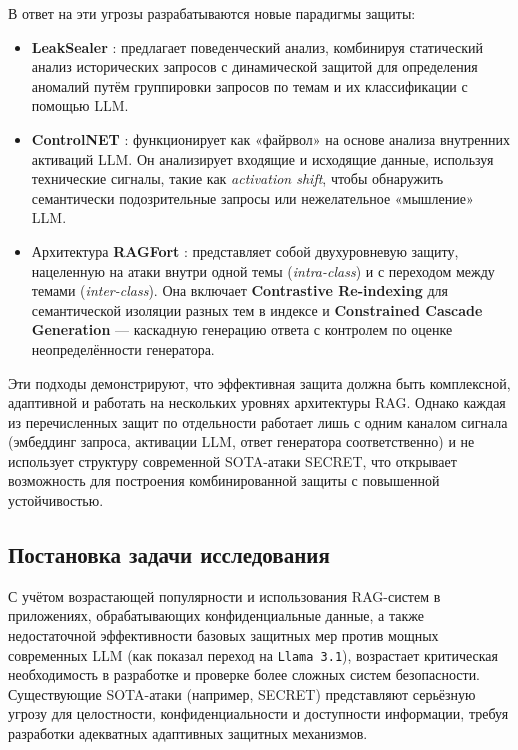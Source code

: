 \documentclass[12pt, a4paper]{article}
\theoremstyle{definition}
\theoremstyle{remark}
\begin{document}
В ответ на эти угрозы разрабатываются новые парадигмы защиты:
\begin{itemize}[label=$\bullet$]
    \item \textbf{LeakSealer} \cite{LeakSealer2025}: предлагает поведенческий анализ, комбинируя статический анализ исторических запросов с динамической защитой для определения аномалий путём группировки запросов по темам и их классификации с помощью LLM.
    \item \textbf{ControlNET} \cite{ControlNET2025}: функционирует как «файрвол» на основе анализа внутренних активаций LLM. Он анализирует входящие и исходящие данные, используя технические сигналы, такие как \textit{activation shift}, чтобы обнаружить семантически подозрительные запросы или нежелательное «мышление» LLM.
    \item Архитектура \textbf{RAGFort} \cite{RAGFort2025}: представляет собой двухуровневую защиту, нацеленную на атаки внутри одной темы (\textit{intra-class}) и с переходом между темами (\textit{inter-class}). Она включает \textbf{Contrastive Re-indexing} для семантической изоляции разных тем в индексе и \textbf{Constrained Cascade Generation} — каскадную генерацию ответа с контролем по оценке неопределённости генератора.
\end{itemize}
Эти подходы демонстрируют, что эффективная защита должна быть комплексной, адаптивной и работать на нескольких уровнях архитектуры RAG. Однако каждая из перечисленных защит по отдельности работает лишь с одним каналом сигнала (эмбеддинг запроса, активации LLM, ответ генератора соответственно) и не использует структуру современной SOTA-атаки SECRET, что открывает возможность для построения комбинированной защиты с повышенной устойчивостью.

\subsection{Постановка задачи исследования}
\label{sec:problem_statement}

С учётом возрастающей популярности и использования RAG-систем в приложениях, обрабатывающих конфиденциальные данные, а также недостаточной эффективности базовых защитных мер против мощных современных LLM (как показал переход на \texttt{Llama~3.1}), возрастает критическая необходимость в разработке и проверке более сложных систем безопасности. Существующие SOTA-атаки (например, SECRET) представляют серьёзную угрозу для целостности, конфиденциальности и доступности информации, требуя разработки адекватных адаптивных защитных механизмов.
\end{document}
